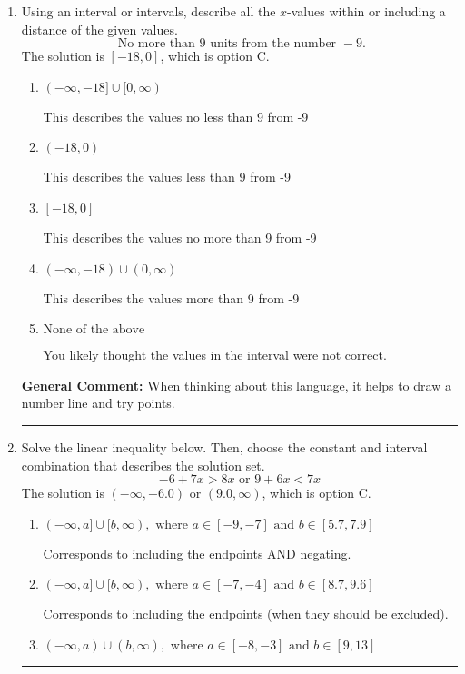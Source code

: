 \documentclass{extbook}[14pt]
\newcommand{\litem}[1]{\item #1

\rule{\textwidth}{0.4pt}}
\begin{document}
\begin{enumerate}
{\begin{enumerate}[label=\Alph*.]
Corresponds to inverting the inequality and negating the solution.
\item \( (-\infty, \infty) \)

Corresponds to the variable canceling, which does not happen in this instance.
\end{enumerate}

\textbf{General Comment:} When multiplying or dividing by a negative, flip the sign.
}
\litem{
Using an interval or intervals, describe all the $x$-values within or including a distance of the given values.
\[ \text{ No more than } 9 \text{ units from the number } -9. \]
The solution is \( [-18, 0] \), which is option C.\begin{enumerate}[label=\Alph*.]
\item \( (-\infty, -18] \cup [0, \infty) \)

This describes the values no less than 9 from -9
\item \( (-18, 0) \)

This describes the values less than 9 from -9
\item \( [-18, 0] \)

This describes the values no more than 9 from -9
\item \( (-\infty, -18) \cup (0, \infty) \)

This describes the values more than 9 from -9
\item \( \text{None of the above} \)

You likely thought the values in the interval were not correct.
\end{enumerate}

\textbf{General Comment:} When thinking about this language, it helps to draw a number line and try points.
}
\litem{
Solve the linear inequality below. Then, choose the constant and interval combination that describes the solution set.
\[ -6 + 7 x > 8 x \text{ or } 9 + 6 x < 7 x \]
The solution is \( (-\infty, -6.0) \text{ or } (9.0, \infty) \), which is option C.\begin{enumerate}[label=\Alph*.]
\item \( (-\infty, a] \cup [b, \infty), \text{ where } a \in [-9, -7] \text{ and } b \in [5.7, 7.9] \)

Corresponds to including the endpoints AND negating.
\item \( (-\infty, a] \cup [b, \infty), \text{ where } a \in [-7, -4] \text{ and } b \in [8.7, 9.6] \)

Corresponds to including the endpoints (when they should be excluded).
\item \( (-\infty, a) \cup (b, \infty), \text{ where } a \in [-8, -3] \text{ and } b \in [9, 13] \)


\end{enumerate}}
\end{enumerate}
\end{document}
